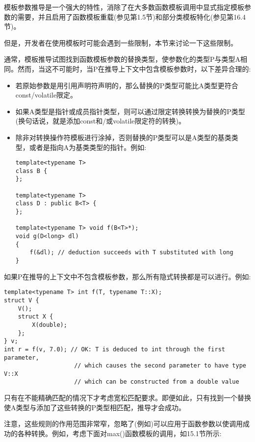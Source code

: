 

模板参数推导是一个强大的特性，消除了在大多数函数模板调用中显式指定模板参数的需要，并且启用了函数模板重载(参见第1.5节)和部分类模板特化(参见第16.4节)。

但是，开发者在使用模板时可能会遇到一些限制，本节来讨论一下这些限制。


通常，模板推导试图找到函数模板参数的替换类型，使参数化的类型P与类型A相同。然而，当这不可能时，当P在推导上下文中包含模板参数时，以下差异合理的:

\begin{itemize}
\item 
若原始参数是用引用声明符声明的，那么替换的P类型可能比A类型更符合const/volatile限定。

\item 
如果A类型是指针或成员指针类型，则可以通过限定转换转换为替换的P类型(换句话说，就是添加const和/或volatile限定符的转换)。

\item 
除非对转换操作符模板进行涂掉，否则替换的P类型可以是A类型的基类类型，或者是指向A为基类类型的指针。例如:

\begin{lstlisting}[style=styleCXX]
template<typename T>
class B {
};

template<typename T>
class D : public B<T> {
};

template<typename T> void f(B<T>*);
void g(D<long> dl)
{
	f(&dl); // deduction succeeds with T substituted with long
}
\end{lstlisting}
\end{itemize}

如果P在推导的上下文中不包含模板参数，那么所有隐式转换都是可以进行。例如:

\begin{lstlisting}[style=styleCXX]
template<typename T> int f(T, typename T::X);
struct V {
	V();
	struct X {
		X(double);
	};
} v;
int r = f(v, 7.0); // OK: T is deduced to int through the first parameter,
					// which causes the second parameter to have type V::X
					// which can be constructed from a double value
\end{lstlisting}

只有在不能精确匹配的情况下才考虑宽松匹配要求。即便如此，只有找到一个替换使A类型与添加了这些转换的P类型相匹配，推导才会成功。

注意，这些规则的作用范围非常窄，忽略了(例如)可以应用于函数参数以使调用成功的各种转换。例如，考虑下面对max()函数模板的调用，如15.1节所示:

